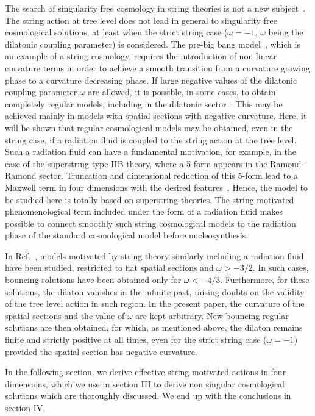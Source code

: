 \documentclass[a4paper,aps,twocolumn,prd,showpacs,nofootinbib]{revtex4}
\begin{document}
The search of singularity free cosmology in string theories is not a
new subject~\cite{lidsey,vasquez,picco,kirill,branden}. The string
action at tree level does not lead in general to singularity free
cosmological solutions, at least when the strict string case ($\omega
= - 1$, $\omega$ being the dilatonic coupling parameter) is
considered. The pre-big bang model~\cite{gasperini}, which is an
example of a string cosmology, requires the introduction of non-linear
curvature terms in order to achieve a smooth transition from a
curvature growing phase to a curvature decreasing phase. If large
negative values of the dilatonic coupling parameter $\omega$ are
allowed, it is possible, in some cases, to obtain completely regular
models, including in the dilatonic sector~\cite{kirill}. This may be
achieved mainly in models with spatial sections with negative
curvature.  Here, it will be shown that regular cosmological models
may be obtained, even in the string case, if a radiation fluid is
coupled to the string action at the tree level. Such a radiation fluid
can have a fundamental motivation, for example, in the case of the
superstring type IIB theory, where a 5-form appears in the
Ramond-Ramond sector. Truncation and dimensional reduction of this
5-form lead to a Maxwell term in four dimensions with the desired
features~\cite{fabris}. Hence, the model to be studied here is totally
based on superstring theories.  The string motivated phenomenological
term included under the form of a radiation fluid makes possible to
connect smoothly such string cosmological models to the radiation
phase of the standard cosmological model before nucleosynthesis.

In Ref.~\cite{picco}, models motivated by string theory similarly
including a radiation fluid have been studied, restricted to flat
spatial sections and $\omega > -3/2$.  In such cases, bouncing
solutions have been obtained only for $\omega < -4/3$. Furthermore,
for these solutions, the dilaton vanishes in the infinite past,
raising doubts on the validity of the tree level action in such
region. In the present paper, the curvature of the spatial sections
and the value of $\omega$ are kept arbitrary.  New bouncing regular
solutions are then obtained, for which, as mentioned above, the
dilaton remains finite and strictly positive at all times, even for
the strict string case ($\omega = -1$) provided the spatial section
has negative curvature.

In the following section, we derive effective string motivated actions
in four dimensions, which we use in section III to derive non singular
cosmological solutions which are thoroughly discussed.  We end up with
the conclusions in section IV.
\end{document}
